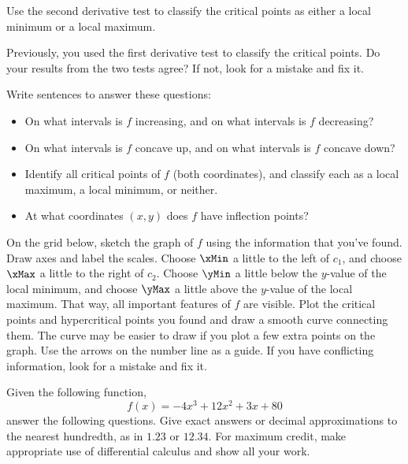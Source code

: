 \begin{ProblemSet}
\begin{Problem}[pencil space=0in]
 \end{Problem}

 \begin{Problem}
  Use the second derivative test to classify the critical points as either a local minimum or a local maximum.
 \end{Problem}
 \begin{Problem}[pencil space=0in]
  Previously, you used the first derivative test to classify the critical points.
  Do your results from the two tests agree?
  If not, look for a mistake and fix it.
 \end{Problem}

 \begin{Problem}[pencil space=3in]
  Write sentences to answer these questions:
  \begin{itemize}
  \item On what intervals is $f$ increasing, and on what intervals is $f$ decreasing?
  \item On what intervals is $f$ concave up, and on what intervals is $f$ concave down?
  \item Identify all critical points of $f$ (both coordinates), and classify each as a local maximum, a local minimum, or neither.
  \item At what coordinates $(x,y)$ does $f$ have inflection points?
  \end{itemize}
 \end{Problem}

 \begin{Problem}
  On the grid below, sketch the graph of $f$ using the information that you've found.
  Draw axes and label the scales.
  Choose $\xMin$ a little to the left of $c_1$, and choose $\xMax$ a little to the right of $c_2$.
  Choose $\yMin$ a little below the $y$-value of the local minimum, and choose $\yMax$ a little above the $y$-value of the local maximum.
  That way, all important features of $f$ are visible.
  Plot the critical points and hypercritical points you found and draw a smooth curve connecting them.
  The curve may be easier to draw if you plot a few extra points on the graph.
  Use the arrows on the number line as a guide.
  If you have conflicting information, look for a mistake and fix it.

 \end{Problem}
\end{ProblemSet}

\GraphingGrid

\newpage

Given the following function,
\begin{equation*}
 f(x) = -4x^3 + 12x^2 + 3x + 80
\end{equation*}
answer the following questions.
Give exact answers or decimal approximations to the nearest hundredth, as in $1.23$ or $12.34$.
For maximum credit, make appropriate use of differential calculus and show all your work.

